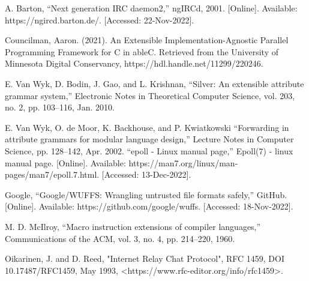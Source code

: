 \documentclass[12pt]{article}
\begin{document}




\newpage

\hypersetup{hidelinks}
\tableofcontents

\newpage


\newpage

\newpage

\newpage

\newpage

\newpage

\newpage

\newpage
\begin{thebibliography}{99}
		A. Barton, “Next generation IRC daemon2,” ngIRCd, 2001. [Online]. Available: https://ngircd.barton.de/.
		[Accessed: 22-Nov-2022]. 


		Councilman, Aaron. (2021). An Extensible Implementation-Agnostic Parallel Programming Framework for C in ableC. Retrieved from the University of
		Minnesota Digital Conservancy, https://hdl.handle.net/11299/220246.

        E. Van Wyk, D. Bodin, J. Gao, and L. Krishnan, “Silver: An extensible 
        attribute grammar system,” Electronic Notes in Theoretical Computer 
        Science, vol. 203, no. 2, pp. 103–116, Jan. 2010. 

		E. Van Wyk, O. de Moor, K. Backhouse, and P. Kwiatkowski “Forwarding in 
        attribute grammars for modular language design,” Lecture Notes in 
        Computer Science, pp. 128–142, Apr. 2002.
    	“epoll - Linux manual page,” Epoll(7) - linux manual page. [Online]. Available: https://man7.org/linux/man-pages/man7/epoll.7.html.
	[Accessed: 13-Dec-2022]. 
    
        Google, “Google/WUFFS: Wrangling untrusted file formats safely,” GitHub. 
        [Online]. Available: https://github.com/google/wuffs. [Accessed: 
        18-Nov-2022]. 
	
		M. D. McIlroy, “Macro instruction extensions of compiler languages,” 
        Communications of the ACM, vol. 3, no. 4, pp. 214–220, 1960. 
	
	    Oikarinen, J. and D. Reed, "Internet Relay Chat Protocol", RFC 1459, DOI 
        10.17487/RFC1459, May 1993, <https://www.rfc-editor.org/info/rfc1459>.
	

\end{thebibliography}
\end{document}
